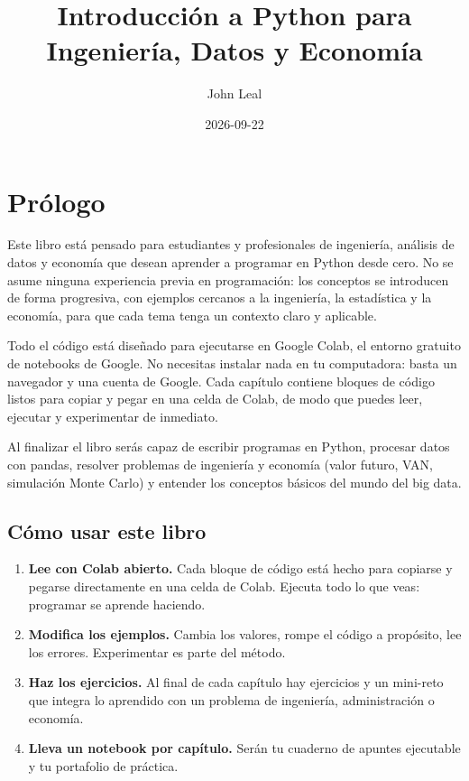\documentclass[
  spanish,
  letterpaper,
  DIV=11,
  numbers=noendperiod]{scrreprt}
\title{Introducción a Python para Ingeniería, Datos y Economía}
\author{John Leal}
\date{2026-09-22}
\providecommand{\tightlist}{%
  \setlength{\itemsep}{0pt}\setlength{\parskip}{0pt}}
\renewcommand*\contentsname{Tabla de contenidos}
\newcommand\contentsname{Tabla de contenidos}
\begin{document}
\maketitle

\renewcommand*\contentsname{Tabla de contenidos}
{
\setcounter{tocdepth}{2}
\tableofcontents
}


\chapter*{Prólogo}\label{pruxf3logo}


Este libro está pensado para estudiantes y profesionales de ingeniería,
análisis de datos y economía que desean aprender a programar en Python
desde cero. No se asume ninguna experiencia previa en programación: los
conceptos se introducen de forma progresiva, con ejemplos cercanos a la
ingeniería, la estadística y la economía, para que cada tema tenga un
contexto claro y aplicable.

Todo el código está diseñado para ejecutarse en Google Colab, el entorno
gratuito de notebooks de Google. No necesitas instalar nada en tu
computadora: basta un navegador y una cuenta de Google. Cada capítulo
contiene bloques de código listos para copiar y pegar en una celda de
Colab, de modo que puedes leer, ejecutar y experimentar de inmediato.

Al finalizar el libro serás capaz de escribir programas en Python,
procesar datos con pandas, resolver problemas de ingeniería y economía
(valor futuro, VAN, simulación Monte Carlo) y entender los conceptos
básicos del mundo del big data.

\section*{Cómo usar este libro}\label{cuxf3mo-usar-este-libro}


\begin{enumerate}
\def\labelenumi{\arabic{enumi}.}
\tightlist
\item
  \textbf{Lee con Colab abierto.} Cada bloque de código está hecho para
  copiarse y pegarse directamente en una celda de Colab. Ejecuta todo lo
  que veas: programar se aprende haciendo.
\item
  \textbf{Modifica los ejemplos.} Cambia los valores, rompe el código a
  propósito, lee los errores. Experimentar es parte del método.
\item
  \textbf{Haz los ejercicios.} Al final de cada capítulo hay ejercicios
  y un mini-reto que integra lo aprendido con un problema de ingeniería,
  administración o economía.
\item
  \textbf{Lleva un notebook por capítulo.} Serán tu cuaderno de apuntes
  ejecutable y tu portafolio de práctica.
\end{enumerate}
\end{document}

